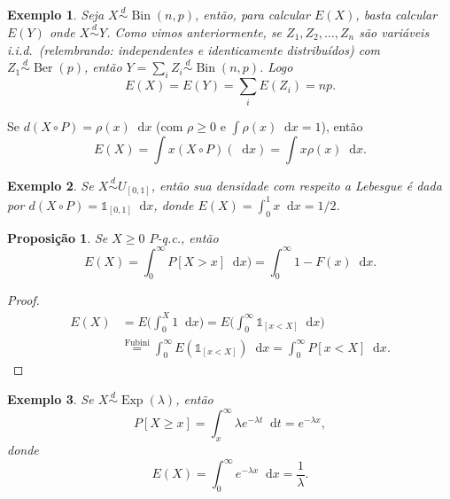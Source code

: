 \documentclass[reqno, draft]{book}
\newcommand*\1{\mathds{1}}
\newtheorem{proposition}[theorem]{Proposição}
\newtheorem{example}{Exemplo}[section]
\DeclareMathOperator{\Ber}{Ber}
\DeclareMathOperator{\Bin}{Bin}
\DeclareMathOperator{\Exp}{Exp}
\def \iid{i.i.d.~}
\renewcommand*\d{\mathop{}\!\mathrm{d}}
\begin{document}
\begin{example}
  Seja $X \overset{d}\sim \Bin(n,p)$, então, para calcular $E(X)$, basta calcular $E(Y)$ onde $X \overset{d}\sim Y$.
  Como vimos anteriormente, se $Z_1, Z_2, \dots, Z_n$ são variáveis \iid (relembrando: independentes e identicamente distribuídos) com $Z_1 \overset{d}\sim \Ber(p)$, então $Y = \sum_i Z_i \overset{d}\sim \Bin(n,p)$.
  Logo
  \begin{equation}
    E(X) = E(Y) = \sum_i E(Z_i) = n p.
  \end{equation}
\end{example}

Se $d(X \circ P) = \rho(x) \d x$ (com $\rho \geq 0$ e $\int \rho(x) \d x = 1$), então
\begin{equation}
  E(X) = \int x (X \circ P)(\d x) = \int x \rho(x) \d x.
\end{equation}

\begin{example}
  Se $X \overset{d}\sim U_{[0,1]}$, então sua densidade com respeito a Lebesgue é dada por $d(X \circ P) = \1_{[0,1]} \d x$, donde $E(X) = \int_0^1 x \d x = 1/2$.
\end{example}

\begin{proposition}
  \label{p:espera_acumulada}
  Se $X \geq 0$ $P$-q.c., então
  \begin{equation}
    E(X) = \int_0^\infty P[X > x] \d x) = \int_0^\infty 1 - F(x) \d x.
  \end{equation}
\end{proposition}

\begin{proof}
  \begin{equation}
    \begin{split}
      E(X) & = E \Big( \int_0^X 1 \d x \Big) = E \Big( \int_0^\infty \1_{[x < X]} \d x \Big)\\
      & \overset{\text{Fubini}}= \int_0^\infty E(\1_{[x < X]}) \d x = \int_0^\infty P[x < X] \d x.
    \end{split}
  \end{equation}
\end{proof}

\begin{example}
  Se $X \overset{d}\sim \Exp(\lambda)$, então
  \begin{equation}
    P[X \geq x] = \int_x^\infty \lambda e^{-\lambda t} \d t = e^{-\lambda x},
  \end{equation}
  donde
  \begin{equation}
    E(X) = \int_0^\infty e^{-\lambda x} \d x = \frac{1}{\lambda}.
  \end{equation}
\end{example}
\end{document}
